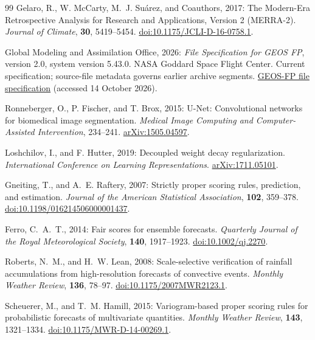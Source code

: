 \documentclass[10pt]{article}
\begin{document}
\begin{thebibliography}{99}
Gelaro, R., W. McCarty, M.~J. Su\'arez, and Coauthors, 2017:
The Modern-Era Retrospective Analysis for Research and Applications, Version 2 (MERRA-2).
\emph{Journal of Climate}, \textbf{30}, 5419--5454.
\href{https://doi.org/10.1175/JCLI-D-16-0758.1}{doi:10.1175/JCLI-D-16-0758.1}.

Global Modeling and Assimilation Office, 2026:
\emph{File Specification for GEOS FP}, version 2.0, system version 5.43.0.
NASA Goddard Space Flight Center. Current specification; source-file metadata governs earlier archive segments.
\href{https://gmao.gsfc.nasa.gov/media/publications/zbly36ziNFDQeVqPhUoFbmYmvh/GEOS_5_FP_File_Specification_ON4v2_0_fqkxorzhgte_FgpliLt.pdf}{GEOS-FP file specification} (accessed 14 October 2026).

Ronneberger, O., P. Fischer, and T. Brox, 2015:
U-Net: Convolutional networks for biomedical image segmentation.
\emph{Medical Image Computing and Computer-Assisted Intervention}, 234--241.
\href{https://arxiv.org/abs/1505.04597}{arXiv:1505.04597}.

Loshchilov, I., and F. Hutter, 2019:
Decoupled weight decay regularization.
\emph{International Conference on Learning Representations}.
\href{https://arxiv.org/abs/1711.05101}{arXiv:1711.05101}.

Gneiting, T., and A.~E. Raftery, 2007:
Strictly proper scoring rules, prediction, and estimation.
\emph{Journal of the American Statistical Association}, \textbf{102}, 359--378.
\href{https://doi.org/10.1198/016214506000001437}{doi:10.1198/016214506000001437}.

Ferro, C.~A.~T., 2014:
Fair scores for ensemble forecasts.
\emph{Quarterly Journal of the Royal Meteorological Society}, \textbf{140}, 1917--1923.
\href{https://doi.org/10.1002/qj.2270}{doi:10.1002/qj.2270}.

Roberts, N.~M., and H.~W. Lean, 2008:
Scale-selective verification of rainfall accumulations from high-resolution forecasts of convective events.
\emph{Monthly Weather Review}, \textbf{136}, 78--97.
\href{https://doi.org/10.1175/2007MWR2123.1}{doi:10.1175/2007MWR2123.1}.

Scheuerer, M., and T.~M. Hamill, 2015:
Variogram-based proper scoring rules for probabilistic forecasts of multivariate quantities.
\emph{Monthly Weather Review}, \textbf{143}, 1321--1334.
\href{https://doi.org/10.1175/MWR-D-14-00269.1}{doi:10.1175/MWR-D-14-00269.1}.
\end{thebibliography}
\end{document}
